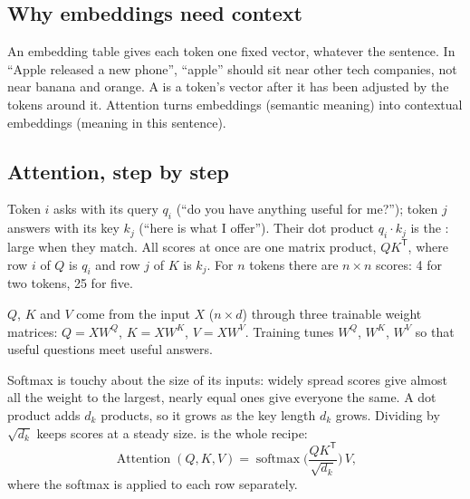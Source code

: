 \subsection*{Why embeddings need context}

\begin{definition}
An embedding table gives each token one fixed vector, whatever the sentence. In ``Apple released a new phone'', ``apple'' should sit near other tech companies, not near banana and orange. A  is a token's vector after it has been adjusted by the tokens around it. Attention turns embeddings (semantic meaning) into contextual embeddings (meaning in this sentence).
\end{definition}

\subsection*{Attention, step by step}

\begin{definition}
Token $i$ asks with its query $q_i$ (``do you have anything useful for me?''); token $j$ answers with its key $k_j$ (``here is what I offer''). Their dot product $q_i \cdot k_j$ is the : large when they match. All scores at once are one matrix product, $QK^{\mathsf T}$, where row $i$ of $Q$ is $q_i$ and row $j$ of $K$ is $k_j$. For $n$ tokens there are $n \times n$ scores: 4 for two tokens, 25 for five.
\end{definition}

\begin{definition}
$Q$, $K$ and $V$ come from the input $X$ ($n \times d$) through three trainable weight matrices: $Q = XW^Q$, $K = XW^K$, $V = XW^V$. Training tunes $W^Q$, $W^K$, $W^V$ so that useful questions meet useful answers.
\end{definition}

\begin{definition}
Softmax is touchy about the size of its inputs: widely spread scores give almost all the weight to the largest, nearly equal ones give everyone the same. A dot product adds $d_k$ products, so it grows as the key length $d_k$ grows. Dividing by $\sqrt{d_k}$ keeps scores at a steady size.  is the whole recipe:
\[
\operatorname{Attention}(Q, K, V) = \operatorname{softmax}\!\Big(\frac{QK^{\mathsf T}}{\sqrt{d_k}}\Big)\, V,
\]
where the softmax is applied to each row separately.
\end{definition}

